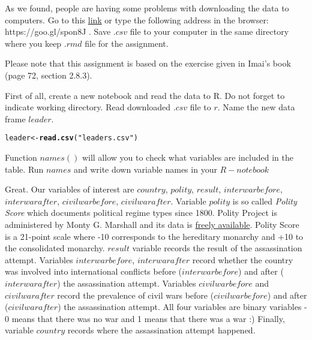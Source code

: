 \documentclass{article}\usepackage[]{graphicx}\usepackage[]{color}
\makeatletter
\newcommand{\hlstr}[1]{\textcolor[rgb]{0.192,0.494,0.8}{#1}}%
\newcommand{\hlstd}[1]{\textcolor[rgb]{0.345,0.345,0.345}{#1}}%
\newcommand{\hlkwb}[1]{\textcolor[rgb]{0.69,0.353,0.396}{#1}}%
\newcommand{\hlkwd}[1]{\textcolor[rgb]{0.737,0.353,0.396}{\textbf{#1}}}%
\newenvironment{kframe}{%
 \def\at@end@of@kframe{}%
 \ifinner\ifhmode%
  \def\at@end@of@kframe{\end{minipage}}%
  \begin{minipage}{\columnwidth}%
 \fi\fi%
 \def\FrameCommand##1{\hskip\@totalleftmargin \hskip-\fboxsep
 \colorbox{shadecolor}{##1}\hskip-\fboxsep
     \hskip-\linewidth \hskip-\@totalleftmargin \hskip\columnwidth}%
 \MakeFramed {\advance\hsize-\width
   \@totalleftmargin\z@ \linewidth\hsize
   \@setminipage}}%
 {\par\unskip\endMakeFramed%
 \at@end@of@kframe}
\newenvironment{knitrout}{}{} %
\makeatother
\begin{document}
As we found, people are having some problems with downloading the data to computers. Go to this \href{https://www.dropbox.com/s/7wbt3h0wyi2yelz/leaders.csv?dl=0}{link} or type the following address in the browser: https://goo.gl/spon8J . Save $.csv$ file to your computer in the same directory where you keep $.rmd$ file for the assignment.

Please note that this assignment is based on the exercise given in Imai's book (page 72, section 2.8.3).

First of all, create a new notebook and read the data to R. Do not forget to indicate working directory. Read downloaded $.csv$ file to $r$. Name the new data frame $leader$. 


\begin{knitrout}
\color{fgcolor}\begin{kframe}
\begin{alltt}
\hlstd{leader} \hlkwb{<-} \hlkwd{read.csv}\hlstd{(}\hlstr{"leaders.csv"}\hlstd{)}
\end{alltt}
\end{kframe}
\end{knitrout}

Function $names()$ will allow you to check what variables are included in the table. Run $names$ and write down variable names in your $R-notebook$

Great. Our variables of interest are $country$, $polity$, $result$, $interwarbefore$, $interwarafter$, $civilwarbefore$, $civilwarafter$. Variable $polity$ is so called \emph{Polity Score} which documents political regime types since 1800. Polity Project is administered by Monty G. Marshall and its data is \href{http://www.systemicpeace.org/polity/polity4.htm}{freely available}. Polity Score is a 21-point scale where -10 corresponds to the hereditary monarchy and +10 to the consolidated monarchy. $result$ variable records the result of the assassination attempt. Variables $interwarbefore$, $interwarafter$ record whether the country was involved into international conflicts before ($interwarbefore$) and after ($interwarafter$) the assassination attempt. Variables $civilwarbefore$ and $civilwarafter$ record the prevalence of civil wars before ($civilwarbefore$) and after ($civilwarafter$) the assassination attempt. All four variables  are binary variables - 0 means that there was no war and 1 means that there was a war :) Finally, variable $country$ records where the assassination attempt happened.
\end{document}
